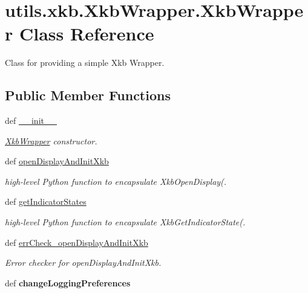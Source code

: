 \hypertarget{classutils_1_1xkb_1_1XkbWrapper_1_1XkbWrapper}{
\section{utils.xkb.XkbWrapper.XkbWrapper Class Reference}
\label{classutils_1_1xkb_1_1XkbWrapper_1_1XkbWrapper}
}


Class for providing a simple Xkb Wrapper.  
\subsection*{Public Member Functions}
\begin{DoxyCompactItemize}
\item 
def \hyperlink{classutils_1_1xkb_1_1XkbWrapper_1_1XkbWrapper_a5abce40ea4fb1f22aea1c27c9d49f945}{\_\-\_\-init\_\-\_\-}
\begin{DoxyCompactList}\small\item\em \hyperlink{classutils_1_1xkb_1_1XkbWrapper_1_1XkbWrapper}{XkbWrapper} constructor. \item\end{DoxyCompactList}\item 
def \hyperlink{classutils_1_1xkb_1_1XkbWrapper_1_1XkbWrapper_af3951614a2c9e25d60d8e0c7f94c6866}{openDisplayAndInitXkb}
\begin{DoxyCompactList}\small\item\em high-\/level Python function to encapsulate XkbOpenDisplay(. \item\end{DoxyCompactList}\item 
def \hyperlink{classutils_1_1xkb_1_1XkbWrapper_1_1XkbWrapper_a291c5d4f5587b13cc04f57ad7c3b57b8}{getIndicatorStates}
\begin{DoxyCompactList}\small\item\em high-\/level Python function to encapsulate XkbGetIndicatorState(. \item\end{DoxyCompactList}\item 
def \hyperlink{classutils_1_1xkb_1_1XkbWrapper_1_1XkbWrapper_af421963b863a37d59c534abafc6f71da}{errCheck\_\-openDisplayAndInitXkb}
\begin{DoxyCompactList}\small\item\em Error checker for openDisplayAndInitXkb. \item\end{DoxyCompactList}\item 
\hypertarget{classutils_1_1xkb_1_1XkbWrapper_1_1XkbWrapper_ac6075c26de887e6d1a386197161393f5}{
def {\bfseries changeLoggingPreferences}}
\label{classutils_1_1xkb_1_1XkbWrapper_1_1XkbWrapper_ac6075c26de887e6d1a386197161393f5}

\end{DoxyCompactItemize}
